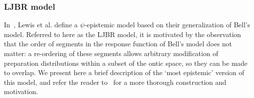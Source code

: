 \documentclass[%
 reprint,
superscriptaddress,
nofootinbib,
 amsmath,amssymb,
 prx, 
 accepted=2019-09-27,
]{quantumarticle}
\begin{document}
\subsubsection{LJBR model}
\label{sec:ljbr-model}

In~\cite{LewisDistinctQuantumStates2012}, Lewis et al. define a
$\psi$-epistemic model based on their generalization of Bell's model.
Referred to here as the LJBR model, it is motivated by the observation
that the order of segments in the response function of Bell's model
does not matter: a re-ordering of these segments allows arbitrary
modification of preparation distributions within a subset of the ontic
space, so they can be made to overlap. We present here a brief
description of the `most epistemic' version of this model, and refer
the reader to~\cite{LewisDistinctQuantumStates2012} for a more
thorough construction and motivation.
\end{document}
